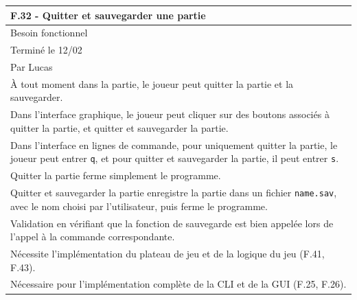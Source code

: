 \documentclass[a4paper,12pt]{article}
\begin{document}
\noindent
\setlength{\arrayrulewidth}{1.5pt}
\renewcommand{\arraystretch}{1.5}
\begin{tabularx}{\textwidth}{|X|}
    \hline
    \textbf{F.32 - Quitter et sauvegarder une partie}                                                                                                                                 \\
    \hline
    Besoin fonctionnel                                                                                                                                                                \\
    \hline
    Terminé le 12/02                                                                                                                                                                  \\
    Par Lucas                                                                                                                                                                         \\
    \hline
    À tout moment dans la partie, le joueur peut quitter la partie et la sauvegarder.                                                                                                 \\
    Dans l’interface graphique, le joueur peut cliquer sur des boutons associés à quitter la partie, et quitter et sauvegarder la partie.                                             \\
    Dans l’interface en lignes de commande, pour uniquement quitter la partie, le joueur peut entrer \texttt{q}, et pour quitter et sauvegarder la partie, il peut entrer \texttt{s}. \\
    Quitter la partie ferme simplement le programme.                                                                                                                                  \\
    Quitter et sauvegarder la partie enregistre la partie dans un fichier \texttt{name.sav}, avec le nom choisi par l’utilisateur, puis ferme le programme.                           \\
    \arrayrulecolor{MediumAquamarine}\hline
    \arrayrulecolor{CornflowerBlue}
    Validation en vérifiant que la fonction de sauvegarde est bien appelée lors de l’appel à la commande correspondante.                                                              \\
    \arrayrulecolor{MediumAquamarine}\hline
    \arrayrulecolor{CornflowerBlue}
    Nécessite l’implémentation du plateau de jeu et de la logique du jeu (F.41, F.43).                                                                                                \\
    Nécessaire pour l’implémentation complète de la CLI et de la GUI (F.25, F.26).                                                                                                    \\
    \hline
\end{tabularx}
\end{document}
